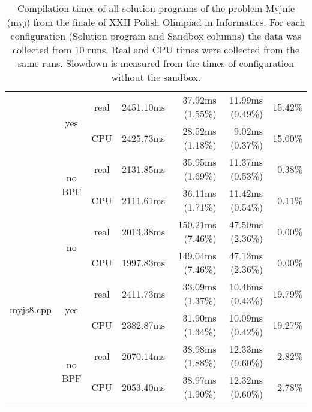 \documentclass[en]{pracamgr}
\begin{document}
\begin{appendices}
\begin{small}
\begin{longtable}{|l|c|c|r|r|r|r|}
                            \cline{2-7}
                            & \multirow{2}{*}{yes}    & real & 2451.10ms & 37.92ms (1.55\%) & 11.99ms (0.49\%) & 15.42\% \\*
                            &                         & CPU  & 2425.73ms & 28.52ms (1.18\%) & 9.02ms (0.37\%) & 15.00\% \\*
                            \cline{2-7}
                            & \multirow{2}{*}{no BPF} & real & 2131.85ms & 35.95ms (1.69\%) & 11.37ms (0.53\%) & 0.38\% \\*
                            &                         & CPU  & 2111.61ms & 36.11ms (1.71\%) & 11.42ms (0.54\%) & 0.11\% \\
\hline
\multirow{6}{*}{myjs8.cpp}  & \multirow{2}{*}{no}     & real & 2013.38ms & 150.21ms (7.46\%) & 47.50ms (2.36\%) & 0.00\% \\*
                            &                         & CPU  & 1997.83ms & 149.04ms (7.46\%) & 47.13ms (2.36\%) & 0.00\% \\*
                            \cline{2-7}
                            & \multirow{2}{*}{yes}    & real & 2411.73ms & 33.09ms (1.37\%) & 10.46ms (0.43\%) & 19.79\% \\*
                            &                         & CPU  & 2382.87ms & 31.90ms (1.34\%) & 10.09ms (0.42\%) & 19.27\% \\*
                            \cline{2-7}
                            & \multirow{2}{*}{no BPF} & real & 2070.14ms & 38.98ms (1.88\%) & 12.33ms (0.60\%) & 2.82\% \\*
                            &                         & CPU  & 2053.40ms & 38.97ms (1.90\%) & 12.32ms (0.60\%) & 2.78\% \\
\hline
\caption{Compilation times of all solution programs of the problem Myjnie (myj) from the finale of XXII Polish Olimpiad in Informatics. For each configuration (Solution program and Sandbox columns) the data was collected from 10 runs. Real and CPU times were collected from the same runs. Slowdown is measured from the times of configuration without the sandbox.}
\label{table:myj_compilation}
\end{longtable}
\end{small}


\end{appendices}
\end{document}
